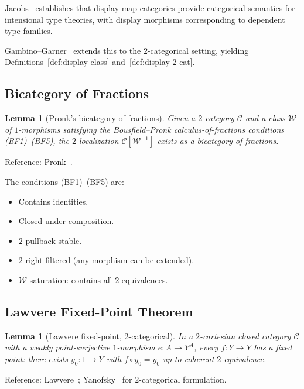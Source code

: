 \documentclass[11pt]{article}
\theoremstyle{plain}
\newtheorem{lemma}[theorem]{Lemma}
\theoremstyle{definition}
\newcommand{\cC}{\mathcal{C}}
\begin{document}
Jacobs~\cite{Jacobs1999} establishes that display map categories provide categorical semantics for intensional type theories, with display morphisms corresponding to dependent type families.

Gambino--Garner~\cite{GambinoGarner2008} extends this to the $2$-categorical setting, yielding Definitions~\ref{def:display-class} and~\ref{def:display-2-cat}.

\subsection{Bicategory of Fractions}

\begin{lemma}[Pronk's bicategory of fractions]\label{lem:pronk}
Given a $2$-category $\cC$ and a class $\mathcal{W}$ of $1$-morphisms satisfying the Bousfield--Pronk calculus-of-fractions conditions (BF1)--(BF5), the $2$-localization $\cC[\mathcal{W}^{-1}]$ exists as a bicategory of fractions.
\end{lemma}

Reference: Pronk~\cite{Pronk1996}.

The conditions (BF1)--(BF5) are:
\begin{itemize}
\item[\textbf{(BF1)}] Contains identities.
\item[\textbf{(BF2)}] Closed under composition.
\item[\textbf{(BF3)}] $2$-pullback stable.
\item[\textbf{(BF4)}] $2$-right-filtered (any morphism can be extended).
\item[\textbf{(BF5)}] $\mathcal{W}$-saturation: contains all $2$-equivalences.
\end{itemize}

\subsection{Lawvere Fixed-Point Theorem}

\begin{lemma}[Lawvere fixed-point, $2$-categorical]\label{lem:lawvere-2}
In a $2$-cartesian closed category $\cC$ with a weakly point-surjective $1$-morphism $e : A \to Y^A$, every $f : Y \to Y$ has a fixed point: there exists $y_0 : 1 \to Y$ with $f \circ y_0 = y_0$ up to coherent $2$-equivalence.
\end{lemma}

Reference: Lawvere~\cite{Lawvere1969}; Yanofsky~\cite{Yanofsky2003} for $2$-categorical formulation.
\end{document}
